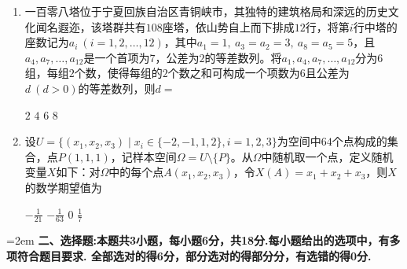 \documentclass[12pt,a4paper]{article}
\begin{document}
\begin{enumerate}[leftmargin=*,label=\arabic*.,itemsep=0.8ex]
		\item 一百零八塔位于宁夏回族自治区青铜峡市，其独特的建筑格局和深远的历史文化闻名遐迩，该塔群共有$108$座塔，依山势自上而下排成$12$行，将第$i$行中塔的座数记为$a_i\ (i=1,2,\dots,12)$，其中$a_1=1,\ a_3=a_2=3,\ a_8=a_5=5$，且$a_4,a_7,\dots,a_{12}$是一个首项为$7$，公差为$2$的等差数列。将$a_1,a_4,a_7,\dots,a_{12}$分为$6$组，每组$2$个数，使得每组的$2$个数之和可构成一个项数为$6$且公差为$d\ (d>0)$的等差数列，则$d=$
		
		\begin{choicesFour}
			\choice $2$ \choice $4$ \choice $6$ \choice $8$
		\end{choicesFour}
		
		\item 设$U=\{(x_1,x_2,x_3)\mid x_i\in\{-2,-1,1,2\},i=1,2,3\}$为空间中$64$个点构成的集合，点$P(1,1,1)$，记样本空间$\Omega=U\setminus\{P\}$。从$\Omega$中随机取一个点，定义随机变量$X$如下：对$\Omega$中的每个点$A(x_1,x_2,x_3)$，令$X(A)=x_1+x_2+x_3$，则$X$的数学期望值为
		
		\begin{choicesFour}
			\choice $-\frac{1}{21}$ \choice $-\frac{1}{63}$ \choice $0$ \choice $\frac{1}{7}$
		\end{choicesFour}
	\end{enumerate}
	
	\vspace{0.3cm}
	
	\noindent\hangindent=2em {\bfseries 二、选择题:本题共3小题，每小题6分，共18分.每小题给出的选项中，有多项符合题目要求. 全部选对的得6分，部分选对的得部分分，有选错的得0分.}
	
\end{document}
